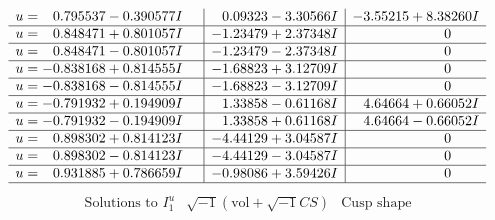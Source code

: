 \documentclass[1p]{elsarticle_modified}
\theoremstyle{definition}
\newcommand{\I}{\sqrt{-1}}
\begin{document}
$$\begin{array}{c|c|c}
\begin{aligned}
u &= \phantom{-}0.795537 - 0.390577 I\end{aligned}
 & \phantom{-}0.09323 - 3.30566 I & -3.55215 + 8.38260 I \\ \hline\begin{aligned}
u &= \phantom{-}0.848471 + 0.801057 I\end{aligned}
 & -1.23479 + 2.37348 I & \phantom{-0.000000 } 0 \\ \hline\begin{aligned}
u &= \phantom{-}0.848471 - 0.801057 I\end{aligned}
 & -1.23479 - 2.37348 I & \phantom{-0.000000 } 0 \\ \hline\begin{aligned}
u &= -0.838168 + 0.814555 I\end{aligned}
 & -1.68823 + 3.12709 I & \phantom{-0.000000 } 0 \\ \hline\begin{aligned}
u &= -0.838168 - 0.814555 I\end{aligned}
 & -1.68823 - 3.12709 I & \phantom{-0.000000 } 0 \\ \hline\begin{aligned}
u &= -0.791932 + 0.194909 I\end{aligned}
 & \phantom{-}1.33858 - 0.61168 I & \phantom{-}4.64664 + 0.66052 I \\ \hline\begin{aligned}
u &= -0.791932 - 0.194909 I\end{aligned}
 & \phantom{-}1.33858 + 0.61168 I & \phantom{-}4.64664 - 0.66052 I \\ \hline\begin{aligned}
u &= \phantom{-}0.898302 + 0.814123 I\end{aligned}
 & -4.44129 + 3.04587 I & \phantom{-0.000000 } 0 \\ \hline\begin{aligned}
u &= \phantom{-}0.898302 - 0.814123 I\end{aligned}
 & -4.44129 - 3.04587 I & \phantom{-0.000000 } 0 \\ \hline\begin{aligned}
u &= \phantom{-}0.931885 + 0.786659 I\end{aligned}
 & -0.98086 + 3.59426 I & \phantom{-0.000000 } 0\\
 \hline 
 \end{array}$$\newpage$$\begin{array}{c|c|c}  
\text{Solutions to }I^u_{1}& \I (\text{vol} + \sqrt{-1}CS) & \text{Cusp shape}\\

\end{array}$$
\end{document}
